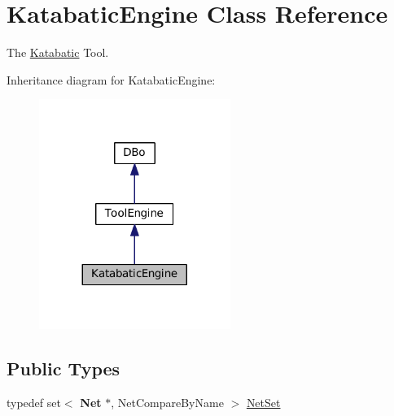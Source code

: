\hypertarget{classKatabatic_1_1KatabaticEngine}{}\section{Katabatic\+Engine Class Reference}
\label{classKatabatic_1_1KatabaticEngine}


The \mbox{\hyperlink{namespaceKatabatic}{Katabatic}} Tool.  




Inheritance diagram for Katabatic\+Engine\+:\nopagebreak
\begin{figure}[H]
\begin{center}
\leavevmode
\includegraphics[width=176pt]{classKatabatic_1_1KatabaticEngine__inherit__graph}
\end{center}
\end{figure}
\subsection*{Public Types}
\begin{DoxyCompactItemize}
\item 
typedef set$<$ \textbf{ Net} $\ast$, Net\+Compare\+By\+Name $>$ \mbox{\hyperlink{classKatabatic_1_1KatabaticEngine_a92ed88f9aecd2f195089c4029fa8bcc7}{Net\+Set}}
\end{DoxyCompactItemize}
